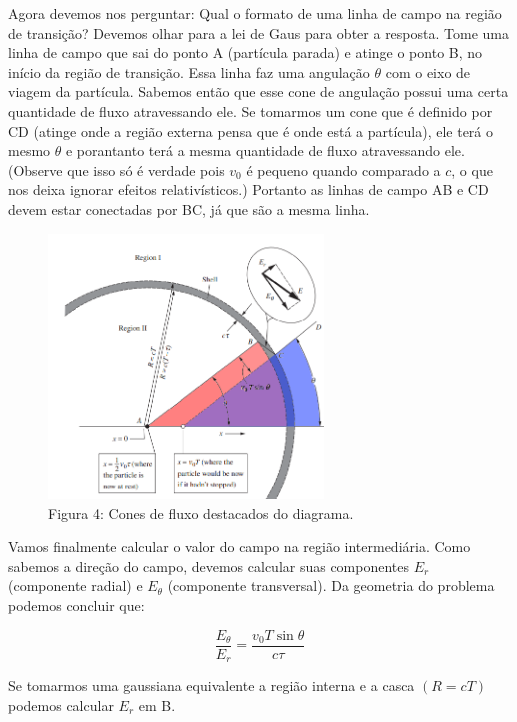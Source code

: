 \documentclass[12pt, letterpaper]{article}
\begin{document}
    Agora devemos nos perguntar: Qual o formato de uma linha de campo na região de transição? Devemos olhar para a lei de Gaus para obter a resposta. Tome uma linha de campo que sai do ponto A (partícula parada) e atinge o ponto B, no início da região de transição. Essa linha faz uma angulação $\theta$ com o eixo de viagem da partícula. Sabemos então que esse cone de angulação possui uma certa quantidade de fluxo atravessando ele. Se tomarmos um cone que é definido por CD (atinge onde a região externa pensa que é onde está a partícula), ele terá o mesmo $\theta$ e porantanto terá a mesma quantidade de fluxo atravessando ele. (Observe que isso só é verdade pois $v_0$ é pequeno quando comparado a $c$, o que nos deixa ignorar efeitos relativísticos.) Portanto as linhas de campo AB e CD devem estar conectadas por BC, já que são a mesma linha.

    \begin{figure}[H]
        \centering
        \includegraphics[width=0.65\textwidth]{highlight}
        \\{Figura 4: Cones de fluxo destacados do diagrama.}
        \label{fig:fig4}
    \end{figure}

    Vamos finalmente calcular o valor do campo na região intermediária. Como sabemos a direção do campo, devemos calcular suas componentes $E_r$ (componente radial) e $E_\theta$ (componente transversal). Da geometria do problema podemos concluir que:
    
    \begin{equation} \label{eq1}
    \frac{E_\theta}{E_r} = \frac{v_0 T\sin{\theta}}{c\tau}
    \end{equation}

    Se tomarmos uma gaussiana equivalente a região interna e a casca $(R = cT)$ podemos calcular $E_r$ em B.
\end{document}
